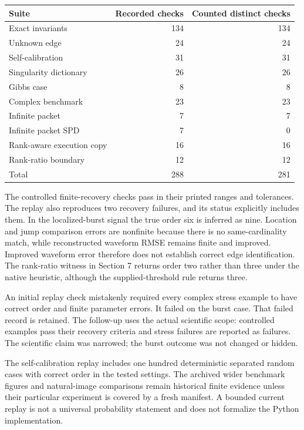 \documentclass[11pt]{article}
\theoremstyle{definition}\newtheorem{definition}[theorem]{Definition}
\theoremstyle{remark}\newtheorem{remark}[theorem]{Remark}
\begin{document}
\begin{center}\small
\begin{tabular}{lrr}
\toprule Suite & Recorded checks & Counted distinct checks\\\midrule
Exact invariants & 134 & 134\\
Unknown edge & 24 & 24\\
Self-calibration & 31 & 31\\
Singularity dictionary & 26 & 26\\
Gibbs case & 8 & 8\\
Complex benchmark & 23 & 23\\
Infinite packet & 7 & 7\\
Infinite packet SPD & 7 & 0\\
Rank-aware execution copy & 16 & 16\\
Rank-ratio boundary & 12 & 12\\\midrule
Total & 288 & 281\\\bottomrule
\end{tabular}\normalsize\end{center}

The controlled finite-recovery checks pass in their printed ranges and
tolerances. The replay also reproduces two recovery failures, and its status
explicitly includes them. In the localized-burst signal the true order six
is inferred as nine. Location and jump comparison errors are nonfinite
because there is no same-cardinality match, while reconstructed waveform
RMSE remains finite and improved. Improved waveform error therefore does not
establish correct edge identification. The rank-ratio witness in Section 7
returns order two rather than three under the native heuristic, although the
supplied-threshold rule returns three.

An initial replay check mistakenly required every complex stress example to
have correct order and finite parameter errors. It failed on the burst case.
That failed record is retained. The follow-up uses the actual scientific
scope: controlled examples pass their recovery criteria and stress failures
are reported as failures. The scientific claim was narrowed; the burst
outcome was not changed or hidden.

The self-calibration replay includes one hundred deterministic separated
random cases with correct order in the tested settings. The archived wider
benchmark figures and natural-image comparisons remain historical finite
evidence unless their particular experiment is covered by a fresh manifest.
A bounded current replay is not a universal probability statement and does
not formalize the Python implementation.
\end{document}
